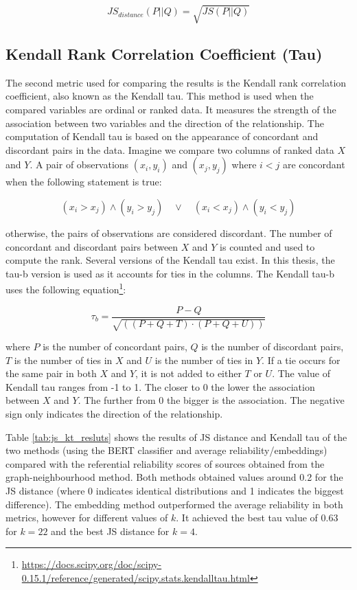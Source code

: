 \begin{equation}
    JS_{distance}(P||Q) = \sqrt{JS(P||Q)}
    \label{eq:js_distance}
\end{equation}

\subsection*{Kendall Rank Correlation Coefficient (Tau)}
The second metric used for comparing the results is the Kendall rank correlation coefficient, also known as the Kendall tau. This method is used when the compared variables are ordinal or ranked data. It measures the strength of the association between two variables and the direction of the relationship. The computation of Kendall tau is based on the appearance of concordant and discordant pairs in the data. Imagine we compare two columns of ranked data $X$ and $Y$. A pair of observations $(x_i, y_i)$ and $(x_j, y_j)$ where $i < j$ are concordant when the following statement is true:

$$(x_i > x_j) \wedge (y_i > y_j) \quad \lor \quad (x_i < x_j) \wedge (y_i < y_j)$$

otherwise, the pairs of observations are considered discordant. The number of concordant and discordant pairs between $X$ and $Y$ is counted and used to compute the rank. Several versions of the Kendall tau exist. In this thesis, the tau-b version is used as it accounts for ties in the columns. The Kendall tau-b uses the following equation\footnote{\url{https://docs.scipy.org/doc/scipy-0.15.1/reference/generated/scipy.stats.kendalltau.html}}:

\begin{equation}
    \tau_b = \displaystyle{\frac{P - Q}{\sqrt{((P+Q+T) \cdot (P+Q+U))}}}
\end{equation}

where $P$ is the number of concordant pairs, $Q$ is the number of discordant pairs, $T$ is the number of ties in $X$ and $U$ is the number of ties in $Y$. If a tie occurs for the same pair in both $X$ and $Y$, it is not added to either $T$ or $U$. The value of Kendall tau ranges from -1 to 1. The closer to 0 the lower the association between $X$ and $Y$. The further from 0 the bigger is the association. The negative sign only indicates the direction of the relationship. 

Table \ref{tab:js_kt_resluts} shows the results of JS distance and Kendall tau of the two methods (using the BERT classifier and average reliability/embeddings) compared with the referential reliability scores of sources obtained from the graph-neighbourhood method. Both methods obtained values around 0.2 for the JS distance (where 0 indicates identical distributions and 1 indicates the biggest difference). The embedding method outperformed the average reliability in both metrics, however for different values of $k$. It achieved the best tau value of 0.63 for $k=22$ and the best JS distance for $k=4$.

